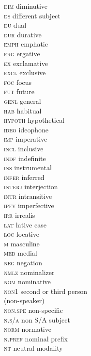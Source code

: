 \documentclass[output=paper]{LSP/langsci}
\begin{document}
\begin{multicols}{2}
\begin{tabbing}
\textsc{dim} \> diminutive \\
\textsc{ds} \> different subject \\
\textsc{du} \> dual \\
\textsc{dur} \> durative \\
\textsc{emph} \> emphatic \\
\textsc{erg} \> ergative \\
\textsc{ex} \> 	exclamative \\
\textsc{excl} \> exclusive \\
\textsc{foc} \> focus \\
\textsc{fut} \> future \\
\textsc{genl} \> general \\
\textsc{hab} \> habitual \\
\textsc{hypoth} \> hypothetical \\
\textsc{ideo} \> ideophone \\
\textsc{imp} \> imperative \\
\textsc{incl} \> inclusive \\
\textsc{indf} \> indefinite \\
\textsc{ins} \> instrumental \\
\textsc{infer} \> inferred \\
\textsc{interj} \> interjection \\
\textsc{intr} \> intransitive \\
\textsc{ipfv} \> imperfective \\
\textsc{irr	} \> irrealis \\
\textsc{lat} \> lative case \\
\textsc{loc} \> locative \\
\textsc{m} \> masculine \\
\textsc{med} \> medial \\
\textsc{neg} \> negation \\
\textsc{nmlz} \> nominalizer \\
\textsc{nom} \> nominative \\
\textsc{non1} \>  second or third person \\ \> (non-speaker) \\\columnbreak
\textsc{non.spe} \> non-specific \\
\textsc{n.s/a} \> non S/A subject \\
\textsc{norm} \> normative \\
\textsc{n.pref} \> nominal prefix \\
\textsc{nt} \> neutral modality \\

\end{tabbing}
\end{multicols}
\end{document}
